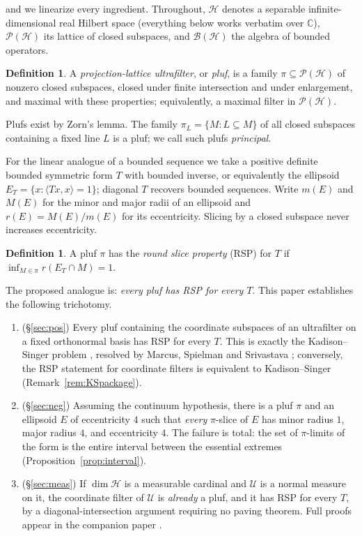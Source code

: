 \documentclass[11pt,reqno]{amsart}
\theoremstyle{definition}
\newtheorem{definition}[theorem]{Definition}
\newcommand{\Mm}{M}   %
\newcommand{\HH}{\mathcal{H}}
\newcommand{\PP}{\mathcal{P}}
\newcommand{\BH}{\mathcal{B}(\HH)}
\newcommand{\pluf}{\pi}
\begin{document}
\noindent and we linearize every ingredient. Throughout, $\HH$ denotes a separable
infinite-dimensional real Hilbert space (everything below works verbatim over
$\mathbb{C}$), $\PP(\HH)$ its lattice of closed subspaces, and $\BH$ the algebra of
bounded operators.

\begin{definition}\label{def:pluf}
A \emph{projection-lattice ultrafilter}, or \emph{pluf}, is a family
$\pluf\subseteq\PP(\HH)$ of nonzero closed subspaces, closed under finite intersection and
under enlargement, and maximal with these properties; equivalently, a maximal filter in
$\PP(\HH)$.
\end{definition}

Plufs exist by Zorn's lemma. The family $\pluf_L=\{M: L\subseteq M\}$ of all closed
subspaces containing a fixed line $L$ is a pluf; we call such plufs \emph{principal}.

For the linear analogue of a bounded sequence we take a positive definite bounded
symmetric form $T$ with bounded inverse, or equivalently the ellipsoid
$E_T=\{x:\langle Tx,x\rangle=1\}$; diagonal $T$ recovers bounded sequences. Write $m(E)$
and $\Mm(E)$ for the minor and major radii of an ellipsoid and $r(E)=\Mm(E)/m(E)$ for its
eccentricity. Slicing by a closed subspace never increases eccentricity.

\begin{definition}\label{def:RSP}
A pluf $\pluf$ has the \emph{round slice property} (RSP) for $T$ if
$\inf_{M\in\pluf}r(E_T\cap M)=1$.
\end{definition}

The proposed analogue is: \emph{every pluf has RSP for every $T$}. This paper establishes
the following trichotomy.

\begin{enumerate}
\item[(A)] (\S\ref{sec:pos}) Every pluf containing the coordinate subspaces of an
ultrafilter on a fixed orthonormal basis has RSP for every $T$. This is exactly the
Kadison--Singer problem \cite{KadisonSinger}, resolved by Marcus, Spielman and Srivastava
\cite{MSS}; conversely, the RSP statement for coordinate filters is equivalent to
Kadison--Singer (Remark~\ref{rem:KSpackage}).
\item[(B)] (\S\ref{sec:neg}) Assuming the continuum hypothesis, there is a pluf $\pluf$
and an ellipsoid $E$ of eccentricity $4$ such that \emph{every} $\pluf$-slice of $E$ has
minor radius $1$, major radius $4$, and eccentricity $4$. The failure is total: the set of
$\pluf$-limits of the form is the entire interval between the essential extremes
(Proposition~\ref{prop:interval}).
\item[(C)] (\S\ref{sec:meas}) If $\dim\HH$ is a measurable cardinal and $\mathcal U$ is a
normal measure on it, the coordinate filter of $\mathcal U$ is \emph{already} a pluf, and
it has RSP for every $T$, by a diagonal-intersection argument requiring no paving theorem.
Full proofs appear in the companion paper \cite{FWIII}.
\end{enumerate}
\end{document}
